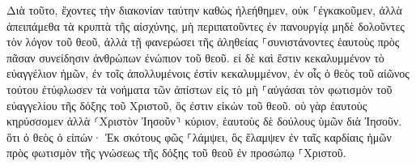 \documentclass{openreader}
\begin{document}
Διὰ τοῦτο, ἔχοντες τὴν διακονίαν ταύτην καθὼς ἠλεήθημεν, οὐκ ⸀ἐγκακοῦμεν, 
ἀλλὰ ἀπειπάμεθα τὰ κρυπτὰ τῆς αἰσχύνης, μὴ περιπατοῦντες ἐν πανουργίᾳ μηδὲ δολοῦντες τὸν λόγον τοῦ θεοῦ, ἀλλὰ τῇ φανερώσει τῆς ἀληθείας ⸀συνιστάνοντες ἑαυτοὺς πρὸς πᾶσαν συνείδησιν ἀνθρώπων ἐνώπιον τοῦ θεοῦ. 
εἰ δὲ καὶ ἔστιν κεκαλυμμένον τὸ εὐαγγέλιον ἡμῶν, ἐν τοῖς ἀπολλυμένοις ἐστὶν κεκαλυμμένον, 
ἐν οἷς ὁ θεὸς τοῦ αἰῶνος τούτου ἐτύφλωσεν τὰ νοήματα τῶν ἀπίστων εἰς τὸ μὴ ⸀αὐγάσαι τὸν φωτισμὸν τοῦ εὐαγγελίου τῆς δόξης τοῦ Χριστοῦ, ὅς ἐστιν εἰκὼν τοῦ θεοῦ. 
οὐ γὰρ ἑαυτοὺς κηρύσσομεν ἀλλὰ ⸂Χριστὸν Ἰησοῦν⸃ κύριον, ἑαυτοὺς δὲ δούλους ὑμῶν διὰ Ἰησοῦν. 
ὅτι ὁ θεὸς ὁ εἰπών· Ἐκ σκότους φῶς ⸀λάμψει, ὃς ἔλαμψεν ἐν ταῖς καρδίαις ἡμῶν πρὸς φωτισμὸν τῆς γνώσεως τῆς δόξης τοῦ θεοῦ ἐν προσώπῳ ⸀Χριστοῦ. 
\end{document}
